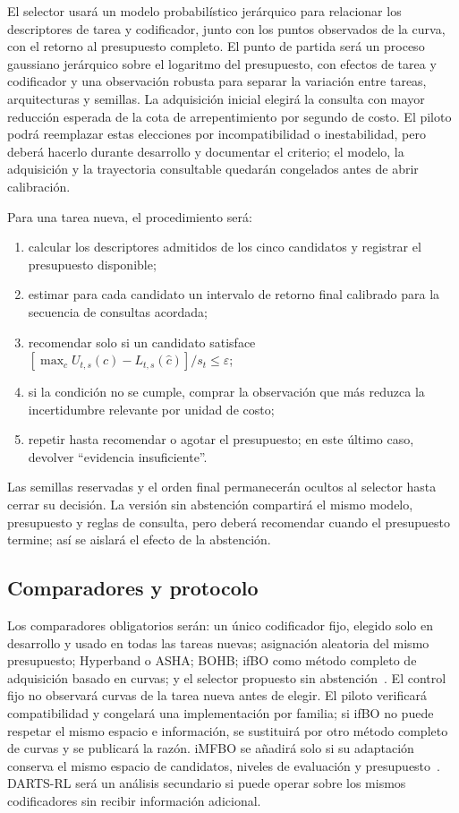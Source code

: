 \documentclass[11pt,letterpaper]{article}
\newcommand{\chat}{\hat c}
\begin{document}
El selector usará un modelo probabilístico jerárquico para relacionar los descriptores de tarea y codificador, junto con los puntos observados de la curva, con el retorno al presupuesto completo.
El punto de partida será un proceso gaussiano jerárquico sobre el logaritmo del presupuesto, con efectos de tarea y codificador y una observación robusta para separar la variación entre tareas, arquitecturas y semillas.
La adquisición inicial elegirá la consulta con mayor reducción esperada de la cota de arrepentimiento por segundo de costo.
El piloto podrá reemplazar estas elecciones por incompatibilidad o inestabilidad, pero deberá hacerlo durante desarrollo y documentar el criterio; el modelo, la adquisición y la trayectoria consultable quedarán congelados antes de abrir calibración.

Para una tarea nueva, el procedimiento será:
\begin{enumerate}
  \item calcular los descriptores admitidos de los cinco candidatos y registrar el presupuesto disponible;
  \item estimar para cada candidato un intervalo de retorno final calibrado para la secuencia de consultas acordada;
  \item recomendar solo si un candidato satisface $[\max_c U_{t,s}(c)-L_{t,s}(\chat)]/s_t\leq\varepsilon$;
  \item si la condición no se cumple, comprar la observación que más reduzca la incertidumbre relevante por unidad de costo;
  \item repetir hasta recomendar o agotar el presupuesto; en este último caso, devolver \enquote{evidencia insuficiente}.
\end{enumerate}

Las semillas reservadas y el orden final permanecerán ocultos al selector hasta cerrar su decisión.
La versión sin abstención compartirá el mismo modelo, presupuesto y reglas de consulta, pero deberá recomendar cuando el presupuesto termine; así se aislará el efecto de la abstención.

\subsection{Comparadores y protocolo}

Los comparadores obligatorios serán: un único codificador fijo, elegido solo en desarrollo y usado en todas las tareas nuevas; asignación aleatoria del mismo presupuesto; Hyperband o ASHA; BOHB; ifBO como método completo de adquisición basado en curvas; y el selector propuesto sin abstención~\cite{li2018hyperband,li2020asha,falkner2018bohb,rakotoarison2024ifbo}.
El control fijo no observará curvas de la tarea nueva antes de elegir.
El piloto verificará compatibilidad y congelará una implementación por familia; si ifBO no puede respetar el mismo espacio e información, se sustituirá por otro método completo de curvas y se publicará la razón.
iMFBO se añadirá solo si su adaptación conserva el mismo espacio de candidatos, niveles de evaluación y presupuesto~\cite{fan2024imfbo}.
DARTS-RL será un análisis secundario si puede operar sobre los mismos codificadores sin recibir información adicional.
\end{document}
